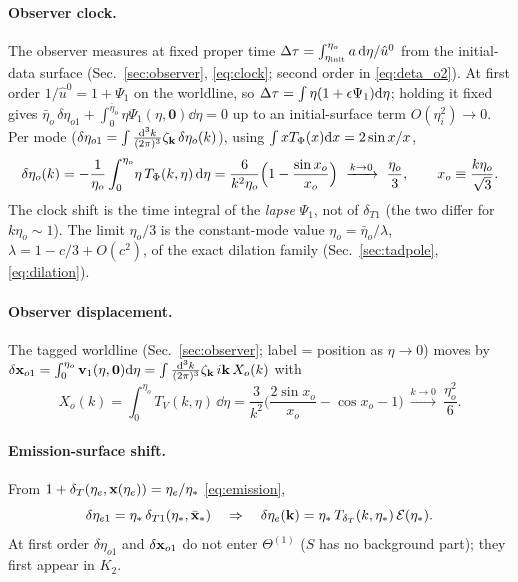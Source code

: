 \paragraph{Observer clock.}  The observer measures at fixed proper time $\Delta\tau=\int_{\eta_{\rm init}}^{\eta_o}a\,\mathrm d\eta/\hat u^0$
from the initial-data surface (Sec.~\ref{sec:observer}, \eqref{eq:clock}; second order in \eqref{eq:deta_o2}).  At first order $1/\hat u^0=1+\Psi_1$ on the worldline,
so $\Delta\tau=\int\eta(1+\epsilon\Psi_1)\mathrm d\eta$; holding it fixed gives $\bar\eta_o\,\delta\eta_{o1}+\int_0^{\bar\eta_o}\eta\Psi_1(\eta,\mathbf0)\dd\eta=0$
up to an initial-surface term $O(\eta_i^2)\to0$.  Per mode ($\delta\eta_{o1}=\int\frac{\mathrm d^3k}{(2\pi)^3}\zeta_\mathbf k\,\delta\eta_o(k)$), using
$\int xT_\Phi(x)\mathrm d x=2\sin x/x$,
\begin{equation}
\delta\eta_o(k)=-\frac1{\eta_o}\int_0^{\eta_o}\!\eta\,T_\Phi(k,\eta)\,\mathrm d\eta=\frac{6}{k^2\eta_o}\Big(1-\frac{\sin x_o}{x_o}\Big)
\ \xrightarrow{k\to0}\ \frac{\eta_o}3,\qquad x_o\equiv\frac{k\eta_o}{\sqrt3}.
\label{eq:asm-clock}
\end{equation}
The clock shift is the time integral of the \emph{lapse} $\Psi_1$, not of $\delta_{T1}$ (the two differ for $k\eta_o\sim1$).
The limit $\eta_o/3$ is the constant-mode value $\eta_o=\bar\eta_o/\lambda$, $\lambda=1-c/3+O(c^2)$, of the exact dilation family
(Sec.~\ref{sec:tadpole}, \eqref{eq:dilation}).

\paragraph{Observer displacement.}  The tagged worldline (Sec.~\ref{sec:observer}; label = position as $\eta\to0$) moves by
$\delta\mathbf x_{o1}=\int_0^{\eta_o}\mathbf v_1(\eta,\mathbf0)\mathrm d\eta=\int\frac{\mathrm d^3k}{(2\pi)^3}\zeta_\mathbf k\,i\mathbf k\,X_o(k)$ with
\begin{equation}
X_o(k)=\int_0^{\eta_o}T_V(k,\eta)\,\dd\eta=\frac3{k^2}\Big(\frac{2\sin x_o}{x_o}-\cos x_o-1\Big)\ \xrightarrow{k\to0}\ \frac{\eta_o^2}6 .
\label{eq:asm-disp}
\end{equation}
\paragraph{Emission-surface shift.}  From $1+\delta_T(\eta_e,\mathbf x(\eta_e))=\eta_e/\eta_*$ \eqref{eq:emission},
\begin{equation}
\delta\eta_{e1}=\eta_*\,\delta_{T1}(\eta_*,\bar{\mathbf x}_*)\quad\Rightarrow\quad \delta\eta_e(\mathbf k)=\eta_*\,T_{\delta_T}(k,\eta_*)\,\mathcal E(\eta_*).
\label{eq:asm-emission}
\end{equation}
At first order $\delta\eta_{o1}$ and $\delta\mathbf x_{o1}$ do not enter $\Theta^{(1)}$ ($S$ has no background part); they first appear in
$K_2$.

